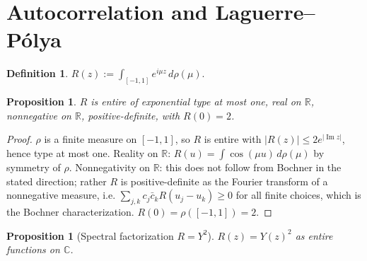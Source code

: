 \documentclass[11pt,a4paper]{article}
\theoremstyle{plain}
\newtheorem{proposition}[theorem]{Proposition}
\theoremstyle{definition}
\newtheorem{definition}[theorem]{Definition}
\theoremstyle{remark}
\newcommand{\R}{\mathbb{R}}
\newcommand{\C}{\mathbb{C}}
\DeclareMathOperator{\Imag}{Im}
\begin{document}
\section{Autocorrelation and Laguerre--P\'olya}

\begin{definition}\label{def:R}
$R(z):=\int_{[-1,1]}e^{i\mu z}\,d\rho(\mu)$.
\end{definition}

\begin{proposition}\label{prop:Rprops}
$R$ is entire of exponential type at most one, real on $\R$, nonnegative on $\R$, positive-definite, with $R(0)=2$.
\end{proposition}

\begin{proof}
$\rho$ is a finite measure on $[-1,1]$, so $R$ is entire with $|R(z)|\le 2 e^{|\Imag z|}$, hence type at most one. Reality on $\R$: $R(u)=\int\cos(\mu u)\,d\rho(\mu)$ by symmetry of $\rho$. Nonnegativity on $\R$: this does not follow from Bochner in the stated direction; rather $R$ is positive-definite as the Fourier transform of a nonnegative measure, i.e. $\sum_{j,k}c_j\bar c_k R(u_j-u_k)\ge 0$ for all finite choices, which is the Bochner characterization. $R(0)=\rho([-1,1])=2$.
\end{proof}

\begin{proposition}[Spectral factorization $R=Y^2$]\label{prop:factor}
$R(z)=Y(z)^2$ as entire functions on $\C$.
\end{proposition}
\end{document}
